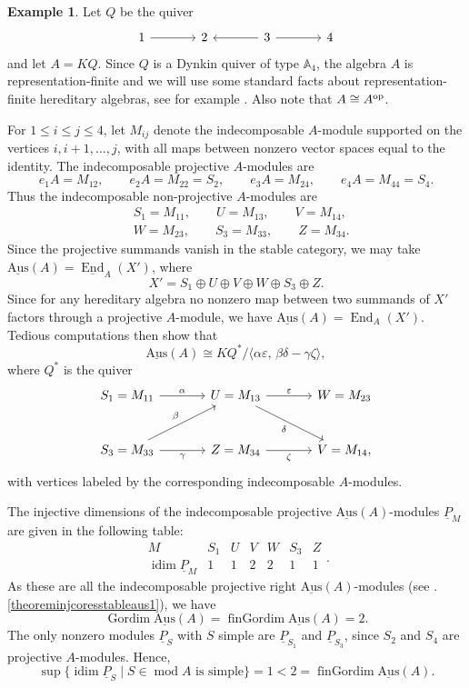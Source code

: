 \documentclass[a4paper]{amsart}
\theoremstyle{definition}
\newtheorem{example}[theorem]{Example}
\theoremstyle{remark}
\numberwithin{equation}{theorem}
\renewcommand{\mod}{\operatorname{mod}}
\newcommand{\End}{\operatorname{End}}
\newcommand{\sAus}{\operatorname{\underline{Aus}}}
\newcommand{\pstab}[1]{\underline{P}_{#1}}
\newcommand{\gordim}{\operatorname{Gordim}}
\newcommand{\fingordim}{\operatorname{finGordim}}
\newcommand{\idim}{\operatorname{idim}}
\newcommand{\DynA}{\mathbb{A}}
\newcommand{\op}{\textnormal{op}}
\newcommand{\K}{K}
\begin{document}
\begin{example}\label{not.at.simples}
Let $Q$ be the quiver
\[
\begin{tikzcd}[column sep=large]
1 \arrow[r] & 2 & 3 \arrow[l] \arrow[r] & 4
\end{tikzcd}
\]
and let $A=\K Q$. Since $Q$ is a Dynkin quiver of type $\DynA_4$, the algebra
$A$ is representation-finite and we will use some standard facts about representation-finite hereditary algebras, see for example \cite[Chapter VII]{ASS}. Also note that $A \cong A^{\op}$.

For $1\leq i\leq j\leq 4$, let $M_{ij}$ denote the indecomposable $A$-module
supported on the vertices $i,i+1,\ldots,j$, with all maps between nonzero
vector spaces equal to the identity. The indecomposable projective
$A$-modules are
\[
e_1A=M_{12},\qquad e_2A=M_{22}=S_2,\qquad
e_3A=M_{24},\qquad e_4A=M_{44}=S_4.
\]
Thus the indecomposable non-projective $A$-modules are
\[
\begin{aligned}
&S_1=M_{11},\qquad U=M_{13},\qquad V=M_{14},\\
&W=M_{23},\qquad S_3=M_{33},\qquad Z=M_{34}.
\end{aligned}
\]
Since the projective summands vanish in the stable category, we may take $ \sAus(A)=\underline{\End}_A(X') $, where
\[
X'=S_1\oplus U\oplus V\oplus W\oplus S_3\oplus Z.
\]
Since for any hereditary algebra no nonzero map between two summands of $X'$ factors through a projective $A$-module, we have $ \sAus(A) =\End_A(X')$.
Tedious computations then show that
\[
\sAus(A)\cong \K Q^* /\langle\alpha\varepsilon,\,
\beta\delta-\gamma\zeta\rangle,
\]
where $ Q^* $ is the quiver
\[
\begin{tikzcd}[column sep=large,row sep=large]
S_1=M_{11} \arrow[r,"\alpha"] & U=M_{13}
  \arrow[r,"\varepsilon"] \arrow[dr,"\delta"'] & W=M_{23} \\
S_3=M_{33} \arrow[ur,"\beta"] \arrow[r,"\gamma"'] & Z=M_{34}
  \arrow[r,"\zeta"'] & V=M_{14} ,
\end{tikzcd}
\]
with vertices labeled by the corresponding
indecomposable $A$-modules.

The injective dimensions of the indecomposable projective $ \sAus(A) $-modules $\pstab M$ are given in the following table:
\[
\begin{array}{c|cccccc}
M&S_1&U&V&W&S_3&Z\\ \hline
\idim\pstab M&1&1&2&2&1&1
\end{array} .
\]
As these are all the indecomposable projective right $\sAus (A) $-modules (see .\eqref{theoreminjcoresstableaus1}), we have
\[
    \gordim \sAus (A) = \fingordim \sAus(A) =2.
\]
The only nonzero modules $\pstab S$ with $S$ simple are $\pstab{S_1}$ and
$\pstab{S_3}$, since $S_2$ and $S_4$ are projective $A$-modules. Hence,
\[
\sup \bigl\{\idim\pstab S\mid S \in \mod A  \text{ is simple} \bigr\}
=1<2=\fingordim\sAus(A).
\]
\end{example}
\end{document}
